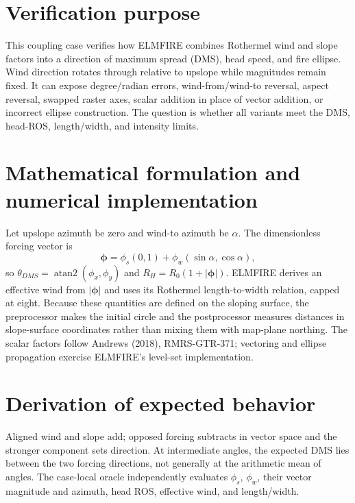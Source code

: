 \section{Verification purpose}
This coupling case verifies how ELMFIRE combines Rothermel wind and slope factors into a direction of maximum spread (DMS), head speed, and fire ellipse.  Wind direction rotates through \AngleSet{} relative to upslope while magnitudes remain fixed.  It can expose degree/radian errors, wind-from/wind-to reversal, aspect reversal, swapped raster axes, scalar addition in place of vector addition, or incorrect ellipse construction.  The question is whether all variants meet the DMS, head-ROS, length/width, and intensity limits.

\section{Mathematical formulation and numerical implementation}
Let upslope azimuth be zero and wind-to azimuth be $\alpha$.  The dimensionless forcing vector is
\begin{equation}\boldsymbol\phi=\phi_s(0,1)+\phi_w(\sin\alpha,\cos\alpha),\end{equation}
so $\theta_{DMS}=\operatorname{atan2}(\phi_x,\phi_y)$ and $R_H=R_0(1+|\boldsymbol\phi|)$.  ELMFIRE derives an effective wind from $|\boldsymbol\phi|$ and uses its Rothermel length-to-width relation, capped at eight.  Because these quantities are defined on the sloping surface, the preprocessor makes the initial circle and the postprocessor measures distances in slope-surface coordinates rather than mixing them with map-plane northing.  The scalar factors follow Andrews (2018), RMRS-GTR-371; vectoring and ellipse propagation exercise ELMFIRE's level-set implementation.

\section{Derivation of expected behavior}
Aligned wind and slope add; opposed forcing subtracts in vector space and the stronger component sets direction.  At intermediate angles, the expected DMS lies between the two forcing directions, not generally at the arithmetic mean of angles.  The case-local oracle independently evaluates $\phi_s$, $\phi_w$, their vector magnitude and azimuth, head ROS, effective wind, and length/width.

